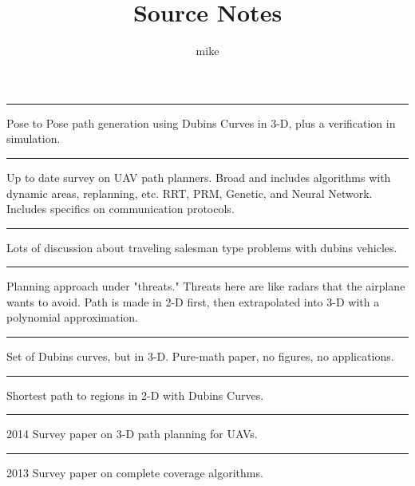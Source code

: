 \documentclass[letterpaper, 10 pt, conference]{ieeeconf}
\title{Source Notes}
\author{mike}
\newcommand{\ct}{\vspace{.1in} \hrule \vspace{0.1in}}
\begin{document}
\maketitle

\ct
Pose to Pose path generation using Dubins Curves in 3-D, plus a verification in simulation.
\cite{ambrosino_algorithms_2006}

\ct
Up to date survey on UAV path planners. Broad and includes algorithms with dynamic areas, replanning, etc. RRT, PRM, Genetic, and Neural Network. Includes specifics on communication protocols.
\cite{ben_amarat_3d_2019}

\ct
Lots of discussion about traveling salesman type problems with dubins vehicles.
\cite{macharet_survey_2018}

\ct
Planning approach under "threats." Threats here are like radars that the airplane wants to avoid. Path is made in 2-D first, then extrapolated into 3-D with a polynomial approximation.
\cite{miller_3d_2011}

\ct
Set of Dubins curves, but in 3-D. Pure-math paper, no figures, no applications.
\cite{sussmann_shortest_1995}

\ct
Shortest path to regions in 2-D with Dubins Curves.

\cite{vana_optimal_2020}


\ct
2014 Survey paper on 3-D path planning for UAVs.

\cite{yang_literature_2014}

\ct
2013 Survey paper on complete coverage algorithms.
\cite{galceran_survey_2013}


\printbibliography
\end{document}
